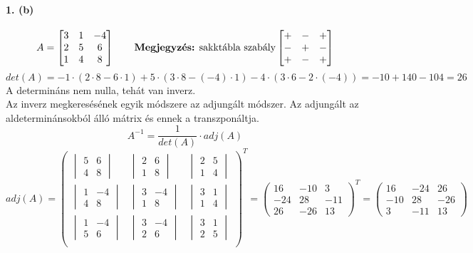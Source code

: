 \documentclass[12pt,a4paper,fleqn]{article}
\newcommand{\myparagraph}[1]{\paragraph{#1}\mbox{}}
\begin{document}
\myparagraph{1. (b)}
\[
  A =
  \begin{bmatrix}
    3 & 1 & -4 \\
    2 & 5 & 6 \\
    1 & 4 & 8
  \end{bmatrix}
  \qquad
  \text{\textbf{Megjegyzés:} sakktábla szabály}
  \begin{bmatrix}
    + & - & + \\
    - & + & - \\
    + & - & +
  \end{bmatrix}
\]
\[
  det(A) = -1 \cdot (2 \cdot 8 - 6 \cdot 1) + 5 \cdot (3 \cdot 8 - (-4) \cdot 1)
    - 4 \cdot (3 \cdot 6 - 2 \cdot (-4)) = -10 + 140 - 104 = 26
\]
A determináns nem nulla, tehát van inverz. \\
Az inverz megkeresésének egyik módszere az adjungált módszer. Az adjungált az
aldeterminánsokból álló mátrix és ennek a transzponáltja.
\[ A^{-1} = \dfrac{1}{det(A)} \cdot adj(A) \]
\[ adj(A) =
  \begin{pmatrix}
    \begin{vmatrix} 5 & 6 \\ 4 & 8 \end{vmatrix}
    &
    \begin{vmatrix} 2 & 6 \\ 1 & 8 \end{vmatrix}
    &
    \begin{vmatrix} 2 & 5 \\ 1 & 4 \end{vmatrix} \\
    \begin{vmatrix} 1 & -4 \\ 4 & 8 \end{vmatrix}
    &
    \begin{vmatrix} 3 & -4 \\ 1 & 8 \end{vmatrix}
    &
    \begin{vmatrix} 3 & 1 \\ 1 & 4 \end{vmatrix} \\
    \begin{vmatrix} 1 & -4 \\ 5 & 6 \end{vmatrix}
    &
    \begin{vmatrix} 3 & -4 \\ 2 & 6 \end{vmatrix}
    &
    \begin{vmatrix} 3 & 1 \\ 2 & 5 \end{vmatrix} \\
  \end{pmatrix}^{T}
  =
  \begin{pmatrix}
    16 & -10 & 3 \\
    -24 & 28 & -11 \\
    26 & -26 & 13
  \end{pmatrix}^{T}
  =
  \begin{pmatrix}
    16 & -24 & 26 \\
    -10 & 28 & -26 \\
    3 & -11 & 13
  \end{pmatrix}
\]
\end{document}
